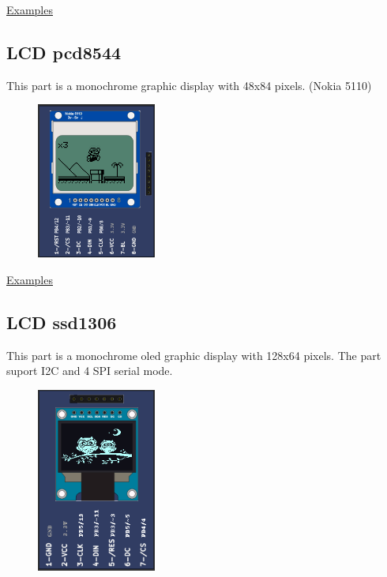 \href{https://lcgamboa.github.io/picsimlab_examples/Parts.html\#LCD_pcf8833}{Examples}


\subsection{LCD pcd8544 }

This part is a monochrome graphic display with 48x84 pixels. (Nokia 5110)

\begin{figure}[H]
\center
\includegraphics[width=0.35\textwidth]{img/part_pcd8544.png} 
\end{figure} 

\href{https://lcgamboa.github.io/picsimlab_examples/Parts.html\#LCD_pcd8544}{Examples}

\subsection{LCD ssd1306 }

This part is a monochrome oled graphic display with 128x64 pixels. 
The part suport I2C and 4 SPI serial mode.

\begin{figure}[H]
\center
\includegraphics[width=0.35\textwidth]{img/part_lcd_ssd1306.png} 
\end{figure} 

